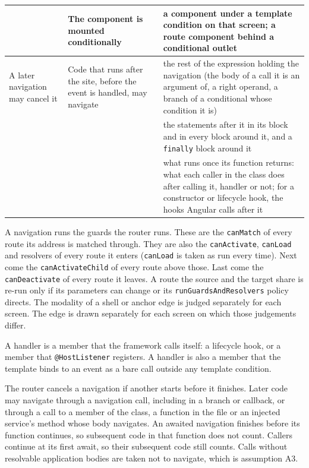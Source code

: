 {\begin{xltabular}{\textwidth}{@{}>{\raggedright\arraybackslash}p{0.17\textwidth}>{\raggedright\arraybackslash}X>{\raggedright\arraybackslash}X@{}}
& The component is mounted conditionally & a component under a template condition on that screen; a route component behind a conditional outlet \\
\midrule
A later navigation may cancel it & Code that runs after the site, before the event is handled, may navigate &
the rest of the expression holding the navigation (the body of a call it is an argument of, a right operand, a branch of a conditional whose condition it is) \\
& &
the statements after it in its block and in every block around it, and a \texttt{finally} block around it \\
& &
what runs once its function returns: what each caller in the class does after calling it, handler or not; for a constructor or lifecycle hook, the hooks Angular calls after it \\
\bottomrule
\end{xltabular}
}

\noindent A navigation runs the guards the router runs. These are the \texttt{canMatch} of every
route its address is matched through. They are also the \texttt{canActivate}, \texttt{canLoad} and
resolvers of every route it enters (\texttt{canLoad} is taken as run every time). Next come the
\texttt{canActivateChild} of every route above those. Last come the \texttt{canDeactivate} of every
route it leaves. A route the source and the target share is re-run only if its parameters can
change or its \texttt{runGuardsAndResolvers} policy directs. The modality of a shell or anchor edge is judged separately for each screen. The edge is drawn
separately for each screen on which those judgements differ.

A handler is a member that the framework calls itself: a lifecycle hook, or a member that
\texttt{@HostListener} registers. A handler is also a member that the template binds to an event as a bare call outside
any template condition.

The router cancels a navigation if another starts before it finishes. Later code may navigate
through a navigation call, including in a branch or callback, or through a call to a member
of the class, a function in the file or an injected service's method whose body navigates. An awaited
navigation finishes before its function continues, so subsequent code in that function does
not count. Callers continue at its first await, so their subsequent code still counts.
Calls without resolvable application bodies are taken not to navigate, which is assumption A3.


